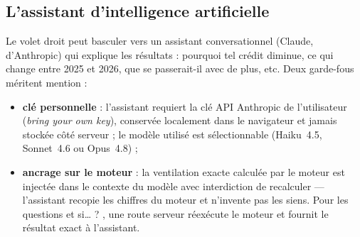 \subsection{L'assistant d'intelligence artificielle}

Le volet droit peut basculer vers un assistant conversationnel (Claude,
d'Anthropic) qui explique les résultats : pourquoi tel crédit diminue, ce qui
change entre 2025 et 2026, que se passerait-il avec  de plus, etc.
Deux garde-fous méritent mention :

\begin{itemize}
  \item \textbf{clé personnelle} : l'assistant requiert la clé API Anthropic
        de l'utilisateur (\emph{bring your own key}), conservée localement
        dans le navigateur et jamais stockée côté serveur ; le modèle
        utilisé est sélectionnable (Haiku~4.5, Sonnet~4.6 ou Opus~4.8) ;
  \item \textbf{ancrage sur le moteur} : la ventilation exacte calculée par
        le moteur est injectée dans le contexte du modèle avec interdiction
        de recalculer --- l'assistant recopie les chiffres du moteur et
        n'invente pas les siens. Pour les questions \og et si\ldots{} ? \fg{},
        une route serveur réexécute le moteur et fournit le résultat exact à
        l'assistant.
\end{itemize}
